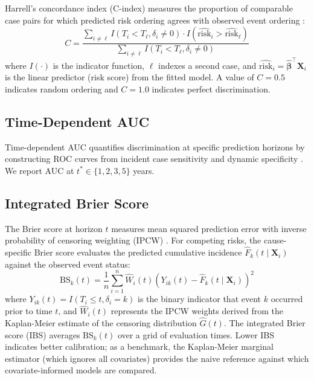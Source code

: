 Harrell's concordance index (C-index) measures the proportion
of comparable case pairs for which predicted risk ordering
agrees with observed event ordering \citep{harrell1982}:
\begin{equation}
C = \frac{\sum_{i \neq \ell} I(T_i < T_\ell, \delta_i \neq 0) \cdot I(\widehat{\text{risk}}_i > \widehat{\text{risk}}_\ell)}{\sum_{i \neq \ell} I(T_i < T_\ell, \delta_i \neq 0)}
\end{equation}
where $I(\cdot)$ is the indicator function, $\ell$ indexes a second case, and $\widehat{\text{risk}}_i = \hat{\boldsymbol{\beta}}^\top \mathbf{X}_i$ is the linear predictor (risk score) from the fitted model. A value of $C = 0.5$ indicates random ordering and $C = 1.0$ indicates perfect discrimination.

\subsection{Time-Dependent AUC}

Time-dependent AUC quantifies discrimination at specific
prediction horizons by constructing ROC curves from incident
case sensitivity and dynamic specificity \citep{heagerty2000}.
We report AUC at $t^* \in \{1, 2, 3, 5\}$ years.

\subsection{Integrated Brier Score}

The Brier score at horizon $t$ measures mean squared prediction
error with inverse probability of censoring weighting (IPCW)
\citep{graf1999}. For competing risks, the cause-specific Brier 
score evaluates the predicted cumulative incidence $\hat{F}_k(t \mid \mathbf{X}_i)$ 
against the observed event status:
\begin{equation}
\text{BS}_k(t) = \frac{1}{n} \sum_{i=1}^n \widehat{W}_i(t) \left( Y_{ik}(t) - \hat{F}_k(t \mid \mathbf{X}_i) \right)^2
\end{equation}
where $Y_{ik}(t) = I(T_i \leq t, \delta_i = k)$ is the binary indicator that event $k$ occurred prior to time $t$, and $\widehat{W}_i(t)$ represents the IPCW weights derived from the Kaplan-Meier estimate of the censoring distribution $\hat{G}(t)$. The integrated Brier score (IBS) averages $\text{BS}_k(t)$
over a grid of evaluation times. Lower IBS indicates better
calibration; as a benchmark, the Kaplan-Meier marginal
estimator (which ignores all covariates) provides the naive
reference against which covariate-informed models are
compared.

